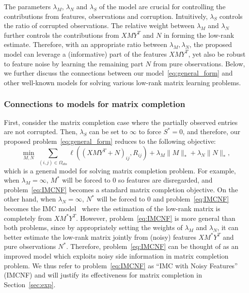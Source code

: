 \documentclass[twoside,11pt]{article}
\def\Obs{\Omega_{obs}}
\def\optM{M^*}
\def\optN{N^*}
\def\optS{S^*}
\begin{document}
The parameters $\lambda_M$, $\lambda_N$ and $\lambda_S$ of the model are crucial for controlling the
contributions from features, observations and corruption.
Intuitively, $\lambda_S$ controls the ratio of corrupted observations.
The relative weight between $\lambda_M$ and $\lambda_N$ further controls the contributions from
$XMY^T$ and $N$ in forming the low-rank estimate.  Therefore,
with an appropriate ratio between $\lambda_M, \lambda_N$,
the proposed model can leverage a (informative) part of the features
$XMY^T$, yet also be robust to feature noise by learning the remaining part $N$ from pure observations.
Below, we further discuss the connections between our model~\eqref{eq:general_form} and other
well-known models for solving various low-rank matrix learning problems.


\subsubsection{Connections to models for matrix completion}
First, consider the matrix completion case where the partially observed entries are not corrupted.
Then, $\lambda_S$ can be set to $\infty$ to force $\optS = 0$, and therefore,
our proposed problem~\eqref{eq:general_form} reduces to the following objective:
\begin{equation}
  \min_{M, N} \ \sum_{(i,j)\in\Obs} \ell((X M Y^T + N)_{ij}, R_{ij})
  + \lambda_M \|M\|_* + \lambda_N \|N\|_*,
  \label{eq:IMCNF}
\end{equation}
which is a general model for solving matrix completion problem.  For example,
when $\lambda_M = \infty$, $\optM$ will be forced to $0$ so features are disregarded,
and problem~\eqref{eq:IMCNF} becomes a standard matrix completion objective.
On the other hand, when $\lambda_N = \infty$, $\optN$ will be forced to $0$ and
problem~\eqref{eq:IMCNF} becomes the IMC model~\citep{Jain13b, Xu13a} where
the estimation of the low-rank matrix is completely from $X\optM Y^T$.
However, problem~\eqref{eq:IMCNF} is more general than both problems, since
by appropriately setting the weights of $\lambda_M$ and $\lambda_N$,
it can better estimate the low-rank matrix jointly from (noisy) features $X\optM Y^T$ and pure
observations $\optN$.
Therefore, problem~\eqref{eq:IMCNF} can be thought of as an improved model which
exploits noisy side information in matrix completion problem.  We thus refer to
problem~\eqref{eq:IMCNF} as ``IMC with Noisy Features'' (IMCNF) and will justify its
effectiveness for matrix completion in Section~\ref{sec:exp}.
\end{document}
